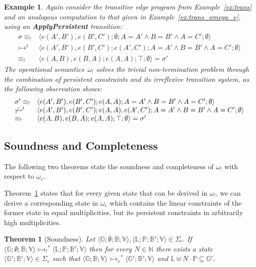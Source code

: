 \documentclass{tlp}
\newtheorem{theorem}{Theorem}
\newtheorem{example}{Example}[section]
\newcommand{\B}{\ensuremath{\mathbb{B}}}
\newcommand{\G}{\ensuremath{\mathbb{G}}}
\newcommand{\bL}{\ensuremath{\mathbb{L}}}
\newcommand{\bP}{\ensuremath{\mathbb{P}}}
\newcommand{\V}{\ensuremath{\mathbb{V}}}
\newcommand{\bang}{\ensuremath{!}}
\def\tuple#1{\langle #1 \rangle}
\newcommand{\stesq}[3]{\ensuremath{\tuple{#1; #2; #3}}}
\newcommand{\stbang}[4]{\ensuremath{\tuple{#1; #2; #3; #4}}}
\newcommand{\obang}{\ensuremath{{\omega_\bang}}}
\newcommand{\oesq}{\ensuremath{{\omega_e}}}
\newcommand{\Sbang}{\ensuremath{{\Sigma_{\bang}}}}
\newcommand{\ebang}{\ensuremath{\equiv_{\bang}}}
\newcommand{\der}{\ensuremath{\rightarrowtail}}
\newcommand{\derbang}{\ensuremath{\der_{\bang}}}
\newcommand{\deresq}{\ensuremath{\der_e}}
\begin{document}
\begin{example}\label{ex:trans_obang}
Again consider the transitive edge program from
Example~\ref{ex:trans} and an analogous computation to that given in
Example~\ref{ex:trans_omega_e}, using an \textbf{ApplyPersistent} transition:
\[
\begin{array}{ll}
\sigma \ebang & \stbang{e(A',B'), e(B',C')}{\emptyset}{A=A' \land B=B'
\land A=C'}{\emptyset}\\
\der^t & \stbang{e(A',B'), e(B',C')}{e(A',C')}{A=A' \land B=B'
\land A=C'}{\emptyset}\\
\ebang & \stbang{e(A,B), e(B,A)}{e(A,A)}{\top}{\emptyset} = \sigma'
\end{array}
\]
The operational semantics~$\obang$ solves the trivial non-termination problem
through the combination of persistent constraints and its irreflexive transition
system, as the following observation shows:
\[
\begin{array}{ll}
\sigma' \ebang & \stbang{e(A',B'), e(B',C')}{e(A,A)}{A=A' \land B=B'
\land A=C'}{\emptyset}\\
\not \der^t & \stbang{e(A',B'), e(B',C')}{e(A,A), e(A',C')}{A=A'
\land B=B' \land A=C'}{\emptyset}\\
\ebang & \stbang{e(A,B), e(B,A)}{e(A,A)}{\top}{\emptyset} = \sigma'
\end{array}
\]
\end{example}

\subsection{Soundness and Completeness}
	\label{sec:sound-complete}

The following two theorems state the soundness and completeness of $\obang$
with respect to $\oesq$.

Theorem~\ref{thm:soundness} states that for every given state that can be
derived in $\obang$, we can derive a corresponding state in $\oesq$ which 
contains the linear constraints of the former state in equal multiplicities,
but its persistent constraints in arbitrarily high multiplicities.

\begin{theorem}[Soundness]\label{thm:soundness}Let
$\stbang{\G}{\emptyset}{\B}{\V},\stbang{\bL}{\bP}{\B'}{\V}\in\Sbang$. If
$\stbang{\G}{\emptyset}{\B}{\V}\derbang^* \stbang{\bL}{\bP}{\B'}{\V}$ then for
every $N\in\mathbb{N}$ there exists a state $\stesq{\G'}{\B'}{\V}\in\Sigma_e$
such that $\stesq{\G}{\B}{\V}\deresq^*\stesq{\G'}{\B'}{\V}$ and $\bL\uplus
N\cdot\bP\subseteq\G'$.
\end{theorem}
\end{document}
